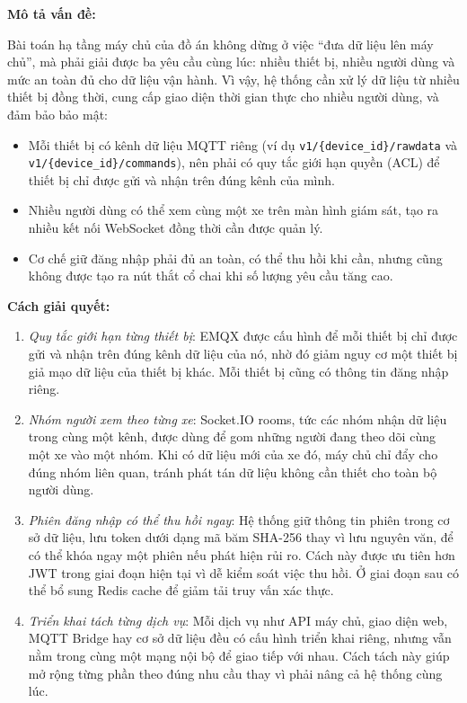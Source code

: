 \documentclass[a4paper]{extarticle}
\providecommand{\tightlist}{%
  \setlength{\itemsep}{0pt}\setlength{\parskip}{0pt}}
\begin{document}
\textbf{Mô tả vấn đề:}

Bài toán hạ tầng máy chủ của đồ án không dừng ở việc ``đưa dữ liệu lên
máy chủ'',
mà phải giải được ba yêu cầu cùng lúc: nhiều thiết bị, nhiều người dùng
và mức an toàn đủ cho dữ liệu vận hành. Vì vậy, hệ thống cần xử lý dữ
liệu từ nhiều thiết bị đồng thời, cung cấp giao diện thời gian thực cho
nhiều người dùng, và đảm bảo bảo mật:

\begin{itemize}
\tightlist
\item
  Mỗi thiết bị có kênh dữ liệu MQTT riêng (ví dụ
  \texttt{v1/\{device\_id\}/rawdata} và
  \texttt{v1/\{device\_id\}/commands}), nên phải có quy tắc giới hạn
  quyền (ACL) để thiết bị chỉ được gửi và nhận trên đúng kênh của mình.
\item
  Nhiều người dùng có thể xem cùng một xe trên màn hình giám sát, tạo ra nhiều
  kết nối WebSocket đồng thời cần được quản lý.
\item
  Cơ chế giữ đăng nhập phải đủ an toàn, có thể thu hồi khi cần, nhưng
  cũng không được tạo ra nút thắt cổ chai khi số lượng yêu cầu tăng cao.
\end{itemize}

\textbf{Cách giải quyết:}

\begin{enumerate}
\def\labelenumi{\arabic{enumi}.}
\tightlist
\item
  \emph{Quy tắc giới hạn từng thiết bị}: EMQX được cấu hình để mỗi thiết
  bị chỉ được gửi và nhận trên đúng kênh dữ liệu của nó, nhờ đó giảm
  nguy cơ một thiết bị giả mạo dữ liệu của thiết bị khác. Mỗi thiết bị
  cũng có thông tin đăng nhập riêng.
\item
  \emph{Nhóm người xem theo từng xe}: Socket.IO rooms, tức các nhóm nhận
  dữ liệu trong cùng một kênh, được dùng để gom những người đang theo
  dõi cùng một xe vào một nhóm. Khi có dữ liệu mới của xe đó, máy chủ
  chỉ đẩy cho đúng nhóm liên quan, tránh phát tán
  dữ liệu không cần thiết cho toàn bộ người dùng.
\item
  \emph{Phiên đăng nhập có thể thu hồi ngay}: Hệ thống giữ thông tin
  phiên trong cơ sở dữ liệu, lưu token dưới dạng mã băm SHA-256 thay vì
  lưu nguyên văn, để có thể khóa ngay một phiên nếu phát hiện rủi ro.
  Cách này được ưu tiên hơn JWT trong giai đoạn hiện tại vì dễ kiểm soát
  việc thu hồi. Ở giai đoạn sau có thể bổ sung Redis cache để giảm tải
  truy vấn xác thực.
\item
  \emph{Triển khai tách từng dịch vụ}: Mỗi dịch vụ như API máy chủ,
  giao diện web, MQTT Bridge hay cơ sở dữ liệu đều có cấu hình triển khai
  riêng, nhưng vẫn nằm trong cùng một mạng nội bộ để giao tiếp với nhau.
  Cách tách này giúp mở rộng từng phần theo đúng nhu cầu thay vì phải
  nâng cả hệ thống cùng lúc.
\end{enumerate}
\end{document}
